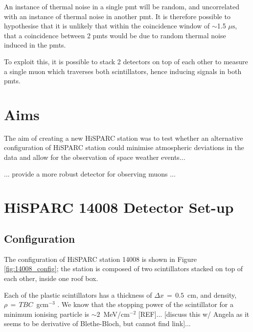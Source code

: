An instance of thermal noise in a single \gls{pmt} will be random, and uncorrelated with an instance of thermal noise in another \gls{pmt}. It is therefore possible to hypothesise that it is unlikely that within the coincidence window of $\sim$1.5 $\mu \mathrm{s}$, that a coincidence between 2 \glspl{pmt} would be due to random thermal noise induced in the \glspl{pmt}.

To exploit this, it is possible to stack 2 detectors on top of each other to measure a single muon which traverses both scintillators, hence inducing signals in both \glspl{pmt}.



\section{Aims}\label{sec:HS_14008_aims}

The aim of creating a new HiSPARC station was to test whether an alternative configuration of HiSPARC station could minimise atmospheric deviations in the data and allow for the observation of space weather events...

... provide a more robust detector for observing muons ...



\section{HiSPARC 14008 Detector Set-up}\label{sec:HiSPARC_14008}


\subsection{Configuration}

The configuration of HiSPARC station 14008 is shown in Figure \ref{fig:14008_config}; the station is composed of two scintillators stacked on top of each other, inside one roof box. 

Each of the plastic scintillators has a thickness of $\Delta x \, = \, 0.5$~cm, and density, $\rho \, = \, TBC$~gcm$^{-3}$ . We know that the stopping power of the scintillator for a minimum ionising particle is $\sim 2$~MeV/cm$^{-2}$ [REF]... [discuss this w/ Angela as it seems to be derivative of Blethe-Bloch, but cannot find link]...

